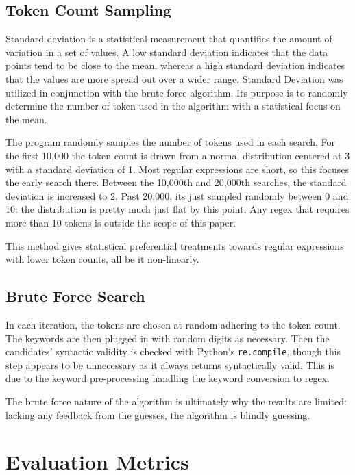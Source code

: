 \documentclass[10pt,twocolumn]{article}
\begin{document}
\subsection{Token Count Sampling}

Standard deviation is a statistical measurement that quantifies the amount of variation in a set of values. A low standard deviation indicates that the data points tend to be close to the mean, whereas a high standard deviation indicates that the values are more spread out over a wider range. Standard Deviation was utilized in conjunction with the brute force algorithm. Its purpose is to randomly determine the number of token used in the algorithm with a statistical focus on the mean.

The program randomly samples the number of tokens used in each search. For the first 10,000 the token count is drawn from a normal distribution centered at 3 with a standard deviation of 1. Most regular expressions are short, so this focuses the early search there. Between the 10,000th and 20,000th searches, the standard deviation is increased to 2. Past 20,000, its just sampled randomly between 0 and 10: the distribution is pretty much just flat by this point. Any regex that requires more than 10 tokens is outside the scope of this paper.

This method gives statistical preferential treatments towards regular expressions with lower token counts, all be it non-linearly.

\subsection{Brute Force Search}

In each iteration, the tokens are chosen at random adhering to the token count. The keywords are then plugged in with random digits as necessary. Then the candidates' syntactic validity is checked with Python's \texttt{re.compile}, though this step appears to be unnecessary as it always returns syntactically valid. This is due to the keyword pre-processing handling the keyword conversion to regex.

The brute force nature of the algorithm is ultimately why the results are limited: lacking any feedback from the guesses, the algorithm is blindly guessing.

\section{Evaluation Metrics}
\end{document}
